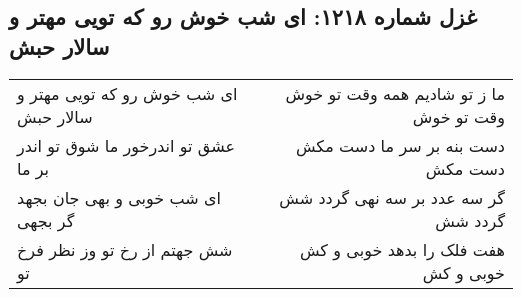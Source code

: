 \begin{center}
\section*{غزل شماره ۱۲۱۸: ای شب خوش رو که تویی مهتر و سالار حبش}
\label{sec:1218}
\begin{longtable}{l p{0.5cm} r}
ای شب خوش رو که تویی مهتر و سالار حبش
&&
ما ز تو شادیم همه وقت تو خوش وقت تو خوش
\\
عشق تو اندرخور ما شوق تو اندر بر ما
&&
دست بنه بر سر ما دست مکش دست مکش
\\
ای شب خوبی و بهی جان بجهد گر بجهی
&&
گر سه عدد بر سه نهی گردد شش گردد شش
\\
شش جهتم از رخ تو وز نظر فرخ تو
&&
هفت فلک را بدهد خوبی و کش خوبی و کش
\\
\end{longtable}
\end{center}
